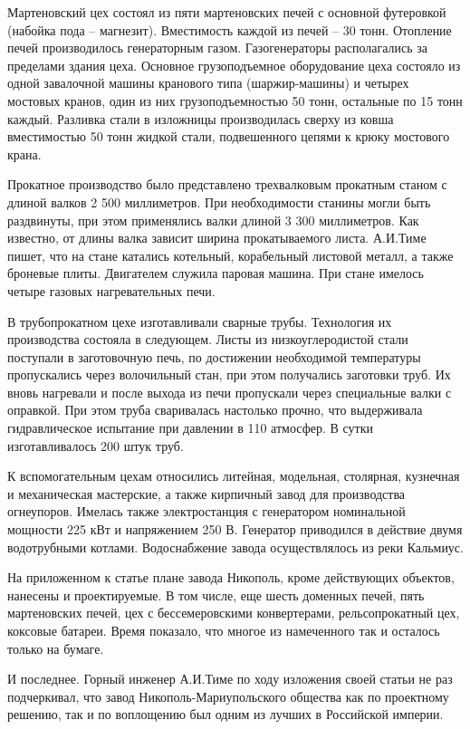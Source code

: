 Мартеновский цех  состоял из пяти мартеновских печей с основной футеровкой
(набойка  пода – магнезит). Вместимость каждой из печей – 30 тонн. Отопление
печей производилось генераторным газом. Газогенераторы располагались за
пределами здания цеха. Основное грузоподъемное оборудование цеха состояло из
одной завалочной машины кранового типа (шаржир-машины) и четырех мостовых
кранов, один из них грузоподъемностью 50 тонн, остальные по 15 тонн каждый.
Разливка стали в изложницы производилась сверху из ковша вместимостью 50 тонн
жидкой стали, подвешенного цепями к крюку мостового крана.

Прокатное производство было представлено трехвалковым прокатным станом с длиной
валков 2 500 миллиметров. При необходимости станины могли быть  раздвинуты, при
этом применялись валки длиной 3 300 миллиметров. Как известно, от длины валка
зависит ширина прокатываемого листа. А.И.Тиме пишет, что на стане катались
котельный, корабельный листовой металл, а также броневые плиты. Двигателем
служила паровая машина. При стане имелось четыре газовых нагревательных печи.

В трубопрокатном цехе изготавливали сварные трубы. Технология их производства
состояла в следующем.  Листы из низкоуглеродистой  стали поступали в
заготовочную печь, по достижении необходимой температуры  пропускались через
волочильный стан, при этом получались заготовки труб. Их вновь нагревали  и
после выхода из печи пропускали через специальные валки с оправкой. При этом
труба сваривалась настолько прочно, что выдерживала гидравлическое испытание
при давлении в 110 атмосфер. В сутки изготавливалось 200 штук труб.

К вспомогательным цехам относились литейная, модельная, столярная,  кузнечная и
механическая мастерские, а также кирпичный завод для производства огнеупоров.
Имелась также электростанция с генератором номинальной мощности 225 кВт и
напряжением 250 В. Генератор приводился в действие двумя водотрубными котлами.
Водоснабжение завода осуществлялось из реки Кальмиус.

На приложенном к статье плане завода Никополь, кроме действующих объектов,
нанесены и проектируемые. В том числе, еще шесть доменных печей, пять
мартеновских печей, цех с бессемеровскими конвертерами, рельсопрокатный цех,
коксовые батареи. Время показало, что многое из намеченного так и осталось
только на бумаге.

И последнее. Горный инженер А.И.Тиме по ходу изложения своей статьи не раз
подчеркивал, что завод Никополь-Мариупольского общества как по проектному
решению, так и по воплощению был одним из лучших в Российской империи.
